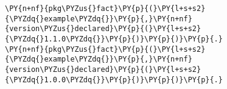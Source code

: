 \begin{Verbatim}[commandchars=\\\{\},fontsize=\footnotesize]
\PY{n+nf}{pkg\PYZus{}fact}\PY{p}{(}\PY{l+s+s2}{\PYZdq{}example\PYZdq{}}\PY{p}{,}\PY{n+nf}{version\PYZus{}declared}\PY{p}{(}\PY{l+s+s2}{\PYZdq{}1.1.0\PYZdq{}}\PY{p}{)}\PY{p}{)}\PY{p}{.}
\PY{n+nf}{pkg\PYZus{}fact}\PY{p}{(}\PY{l+s+s2}{\PYZdq{}example\PYZdq{}}\PY{p}{,}\PY{n+nf}{version\PYZus{}declared}\PY{p}{(}\PY{l+s+s2}{\PYZdq{}1.0.0\PYZdq{}}\PY{p}{)}\PY{p}{)}\PY{p}{.}
\end{Verbatim}
